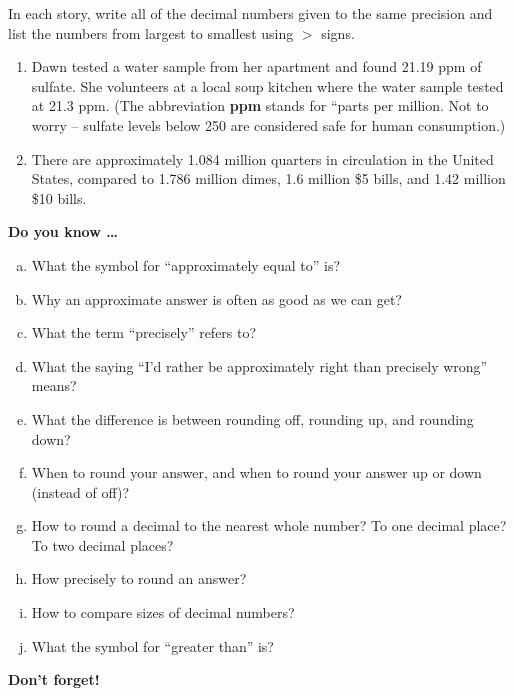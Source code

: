 \begin{enumerate}
In each story, write all of the decimal numbers given to the same precision and list the numbers from largest to smallest using $>$ signs.

\begin{enumerate}
\item Dawn tested a water sample from her apartment and found 21.19 ppm of sulfate.  She volunteers at a local soup kitchen where the water sample tested at 21.3 ppm.  (The abbreviation \textbf{ppm} stands for ``parts per million.  Not to worry -- sulfate levels below 250 are considered safe for human consumption.)
\vfill
\item There are approximately 1.084 million quarters in circulation in the United States, compared to 1.786 million dimes, 1.6 million \$5 bills,  and 1.42 million \$10 bills.
\vfill

\end{enumerate}

\end{enumerate} %

\newpage



\bigskip

\noindent \textbf{Do you know \ldots}

\begin{enumerate}[(a)]
\item What the symbol for ``approximately equal to'' is? \vfill
\item Why an approximate answer is often as good as we can get? \vfill
\item What the term ``precisely'' refers to? \vfill
\item What the saying ``I'd rather be approximately right than precisely wrong'' means? \vfill
\item What the difference is between rounding off, rounding up, and rounding down? \vfill
\item When to round your answer, and when to round your answer up or down (instead of off)? \vfill
\item How to round a decimal to the nearest whole number? \vfill  To one decimal place? \vfill  To two decimal places? \vfill
\item How precisely to round an answer? \vfill
\item How to compare sizes of decimal numbers? \vfill
\item What the symbol for ``greater than'' is? \vfill
\end{enumerate}

\noindent \textbf{Don't forget!}
\vfill \vfill \vfill





